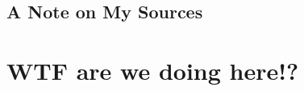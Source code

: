 \documentclass[noraggedright]{turabian-researchpaper}
\begin{document}
	
	\subsection{A Note on My Sources}
		



\section{WTF are we doing here!?} %






\section{} %
\end{document}
